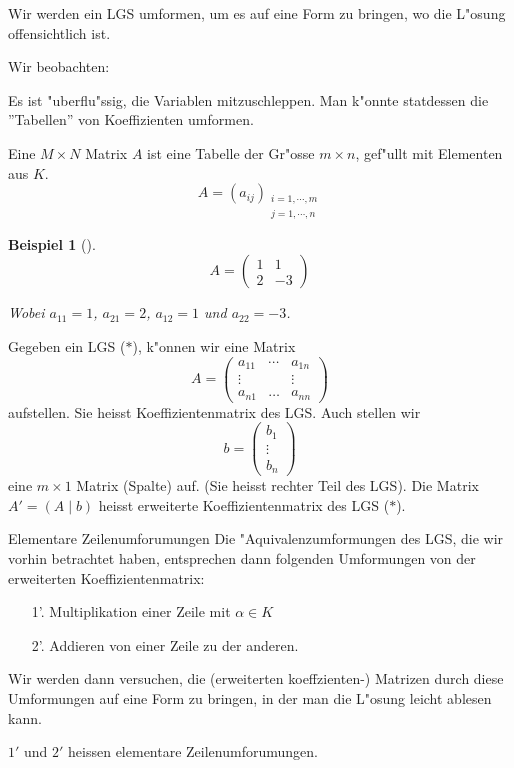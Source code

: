 \documentclass[11pt]{article}
\newtheorem{exa}{Beispiel}[section]
\begin{document}
Wir werden ein LGS umformen, um es auf eine Form zu bringen, wo die L"osung
offensichtlich ist.

Wir beobachten:
\begin{relation}
Es ist "uberflu"ssig, die Variablen mitzuschleppen. Man k"onnte statdessen die
''Tabellen'' von Koeffizienten umformen.
\end{relation}

\begin{definition}{}{}
Eine \(M\times N\) Matrix \(A\) ist eine Tabelle der Gr"osse \(m\times n\), gef"ullt
mit Elementen aus \(K\).  
\[A=(a_{ij})_{\substack{i=1,\cdots,m \\ j=1,\cdots,n}}\]
\end{definition}

\begin{exa}[] \label{}
\[
  A=\left( \begin{matrix} 1& 1\\ 2& -3\end{matrix} \right)
\]

Wobei \(a_{11} = 1\), \(a_{21} = 2\), \(a_{12}=1\) und \(a_{22}=-3\).
\end{exa}

\begin{relation}
Gegeben ein LGS (\(*\)), k"onnen wir eine Matrix \[ A=\left( \begin{matrix}
a_{11}& \cdots & a_{1n}\\ \vdots & & \vdots \\ a_{n1}& \ldots &
a_{nn}\end{matrix} \right) \] aufstellen. Sie heisst Koeffizientenmatrix des
LGS. Auch stellen wir \[b=\left( \begin{matrix} b_{1}\\ \vdots
\\ b_{n}\end{matrix} \right)\]
eine \(m\times 1\) Matrix (Spalte) auf. (Sie
heisst rechter Teil des LGS). Die Matrix \(A'=(A\mid b)\) heisst erweiterte
Koeffizientenmatrix des LGS (\(*\)).
\end{relation}


\begin{definition}{Elementare Zeilenumforumungen}{}
Die "Aquivalenzumformungen des LGS, die wir vorhin betrachtet haben, entsprechen
dann folgenden Umformungen von der erweiterten Koeffizientenmatrix: 
\begin{itemize}
 \item[1'.] Multiplikation einer Zeile mit $\alpha \in K$
 \item[2'.] Addieren von einer Zeile zu der anderen.
\end{itemize}
Wir werden dann versuchen, die (erweiterten koeffzienten-) Matrizen durch diese
Umformungen auf eine Form zu bringen, in der man die L"osung leicht ablesen
kann.

\(1'\) und \(2'\) heissen elementare Zeilenumforumungen.
\end{definition}
\end{document}
